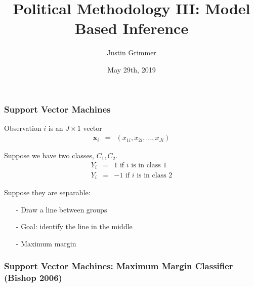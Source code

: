 \documentclass{beamer}
\title[Methodology III] %
{Political Methodology III: Model Based Inference}
\author{Justin Grimmer}
\institute[Stanford University]{Professor\\Department of Political Science \\  Stanford University}
\date{May 29th, 2019}
\numberwithin{equation}{section}
\begin{document}
\begin{frame}
\titlepage
\end{frame}








\begin{frame}
\frametitle{Support Vector Machines} 

Observation $i$ is an $J \times 1$ vector 
\begin{eqnarray}
\boldsymbol{x}_i & = & (x_{1i}, x_{2i}, \hdots, x_{Ji} ) \nonumber 
\end{eqnarray}

Suppose we have \alert{two} classes, $C_1, C_2$.  
\begin{eqnarray}
Y_i & = & 1 \text{ if $i$ is in class 1} \nonumber \\
Y_i & = & -1 \text{ if $i$ is in class 2} \nonumber 
\end{eqnarray}



Suppose they are \alert{separable}: 
\begin{itemize} 
\item[-] Draw a line between groups
\item[-] Goal: identify the line \alert{in the middle} 
\item[-] \alert{Maximum margin} 
\end{itemize}



\end{frame}


\begin{frame}
\frametitle{Support Vector Machines: Maximum Margin Classifier (Bishop 2006)} 




\end{frame}
\end{document}
